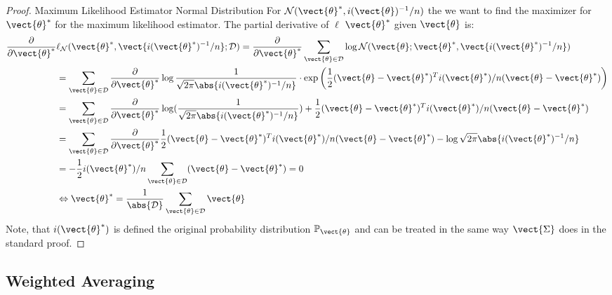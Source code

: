 \begin{proof}{Maximum Likelihood Estimator Normal Distribution}
    For $\mathcal{N}(\vect{\theta}^*, i(\vect{\theta})^{-1}/n)$ the we want to find the maximizer for $\vect{\theta}^*$ for the maximum likelihood estimator. 
    The partial derivative of $\ell$ \wrt $\vect{\theta}^*$ given $\vect{\theta}$ is:
    \begin{equation}
        \begin{split}
        \frac{\partial}{\partial \vect{\theta}^*}&\ell_{\mathcal{N}}(\vect{\theta}^*, \vect{i(\vect{\theta}^*)^{-1}/n}; \mathcal{D}) =  \frac{\partial}{\partial \vect{\theta}^*} \sum_{\vect{\theta} \in \mathcal{D}} \log \mathcal{N}(\vect{\theta}; \vect{\theta}^*, \vect{i(\vect{\theta}^*)^{-1}/n})\\
        &=  \sum_{\vect{\theta} \in \mathcal{D}} \frac{\partial}{\partial \vect{\theta}^*} \log \frac{1}{\sqrt{2 \pi} \abs{i(\vect{\theta}^*)^{-1}/n}} \cdot \exp\bigg(\frac{1}{2} (\vect{\theta} - \vect{\theta}^*)^Ti(\vect{\theta}^*)/n(\vect{\theta} - \vect{\theta}^*) \bigg) \\
        &=  \sum_{\vect{\theta} \in \mathcal{D}} \frac{\partial}{\partial \vect{\theta}^*} \log (\frac{1}{\sqrt{2 \pi} \abs{i(\vect{\theta}^*)^{-1}/n}}) + \frac{1}{2} (\vect{\theta} - \vect{\theta}^*)^Ti(\vect{\theta}^*)/n(\vect{\theta} - \vect{\theta}^*) \\
        &=  \sum_{\vect{\theta} \in \mathcal{D}} \frac{\partial}{\partial \vect{\theta}^*} \frac{1}{2} (\vect{\theta} - \vect{\theta}^*)^Ti(\vect{\theta}^*)/n(\vect{\theta} - \vect{\theta}^*) - \log \sqrt{2 \pi} \abs{i(\vect{\theta}^*)^{-1}/n} \\
        &= - \frac{1}{2} i(\vect{\theta}^*)/n \sum_{\vect{\theta} \in \mathcal{D}} (\vect{\theta} - \vect{\theta}^*) = 0 \\
        &\Leftrightarrow \vect{\theta}^* = \frac{1}{\abs{\mathcal{D}}} \sum_{\vect{\theta} \in \mathcal{D}}  \vect{\theta}
        \end{split}
    \end{equation}
    Note, that $i(\vect{\theta}^*)$ is defined \wrt the original probability distribution $\mathbb{P}_{\vect{\theta}}$ and can be treated in the same way $\vect{\Sigma}$ does in the standard proof.
\end{proof}



\subsection{Weighted Averaging}

